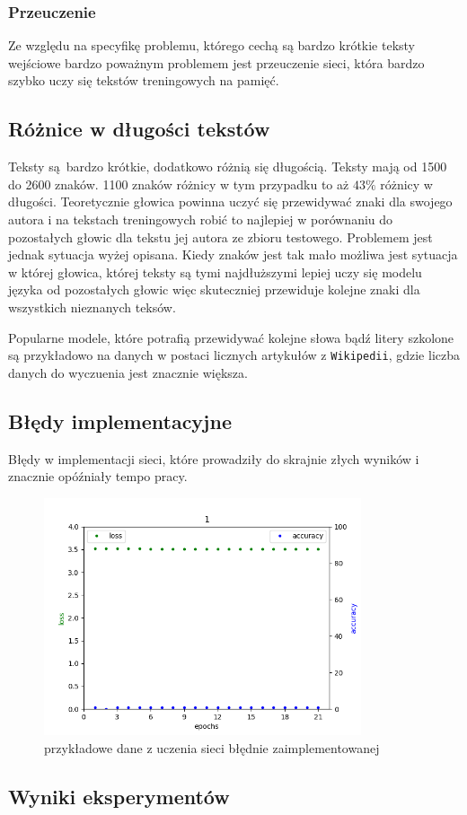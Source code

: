 \subsubsection{Przeuczenie}
Ze względu na specyfikę problemu, którego cechą są bardzo krótkie teksty wejściowe bardzo poważnym 
problemem jest przeuczenie sieci, która
bardzo szybko uczy się tekstów treningowych na pamięć. 

\subsection{Różnice w długości tekstów}
Teksty są bardzo krótkie, dodatkowo różnią się długością. Teksty mają od 1500 do 2600 znaków. 1100 znaków 
różnicy w tym przypadku to aż $43\%$ różnicy w długości. Teoretycznie głowica powinna uczyć się przewidywać znaki dla 
swojego autora i na tekstach treningowych robić to najlepiej w porównaniu do pozostałych głowic dla tekstu 
jej autora ze zbioru testowego. Problemem jest jednak sytuacja wyżej opisana. Kiedy znaków jest tak mało 
możliwa jest sytuacja w której głowica, której teksty są tymi najdłuższymi lepiej uczy się modelu języka od
pozostałych głowic więc skuteczniej przewiduje kolejne znaki dla wszystkich nieznanych teksów.

Popularne modele, które potrafią przewidywać kolejne słowa bądź litery szkolone są przykładowo na danych w postaci licznych 
artykułów z \texttt{Wikipedii}, gdzie liczba danych do wyczuenia jest znacznie większa.

\subsection{Błędy implementacyjne}
Błędy w implementacji sieci, które prowadziły do skrajnie złych wyników i znacznie opóźniały tempo pracy.
\begin{figure}[H]
	\centering
	\includegraphics[height=7cm]{./images/result1.png}
	\caption{przykładowe dane z uczenia sieci błędnie zaimplementowanej}
	\label{fig:test5}
	\end{figure}

\subsection{Wyniki eksperymentów}
